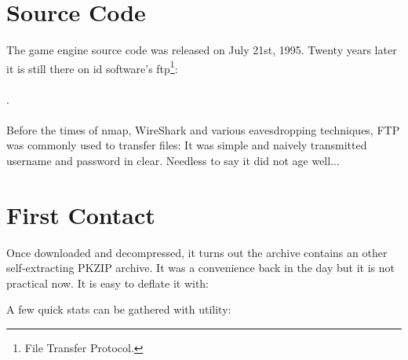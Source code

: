 \documentclass[book.tex]{subfiles}
\begin{document}
\section{Source Code}
The game engine source code was released on July 21st, 1995. Twenty years later it is still there on id software's ftp\footnote{File Transfer Protocol.}:\\ 
\\.\\
\\
 Before the times of nmap, WireShark and various eavesdropping techniques, FTP was commonly used to transfer files: It was simple and naively transmitted username and password in clear. Needless to say it did not age well...\\

\section{First Contact}
Once downloaded and decompressed, it turns out the archive  contains an other self-extracting PKZIP archive. It was a convenience back in the day but it is not practical now. It is easy to deflate it with:\\
\par
\begin{minipage}{\textwidth}

\end{minipage}
\par
A few quick stats can be gathered with  utility:\\

\par
\begin{minipage}{\textwidth}

\end{minipage}
\end{document}
